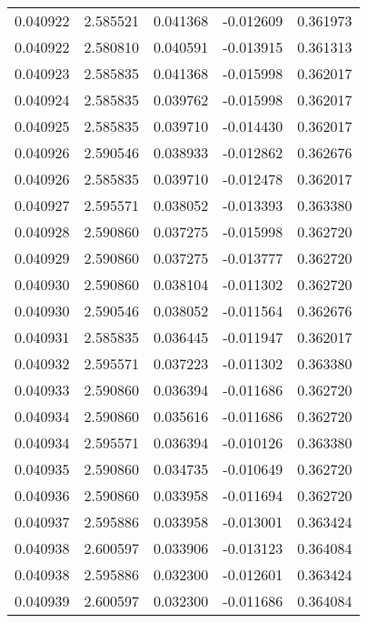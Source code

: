 \begin{tabular}{lrrrr}
0.040922    &  2.585521 &  0.041368 & -0.012609 &             0.361973 \\
0.040922    &  2.580810 &  0.040591 & -0.013915 &             0.361313 \\
0.040923    &  2.585835 &  0.041368 & -0.015998 &             0.362017 \\
0.040924    &  2.585835 &  0.039762 & -0.015998 &             0.362017 \\
0.040925    &  2.585835 &  0.039710 & -0.014430 &             0.362017 \\
0.040926    &  2.590546 &  0.038933 & -0.012862 &             0.362676 \\
0.040926    &  2.585835 &  0.039710 & -0.012478 &             0.362017 \\
0.040927    &  2.595571 &  0.038052 & -0.013393 &             0.363380 \\
0.040928    &  2.590860 &  0.037275 & -0.015998 &             0.362720 \\
0.040929    &  2.590860 &  0.037275 & -0.013777 &             0.362720 \\
0.040930    &  2.590860 &  0.038104 & -0.011302 &             0.362720 \\
0.040930    &  2.590546 &  0.038052 & -0.011564 &             0.362676 \\
0.040931    &  2.585835 &  0.036445 & -0.011947 &             0.362017 \\
0.040932    &  2.595571 &  0.037223 & -0.011302 &             0.363380 \\
0.040933    &  2.590860 &  0.036394 & -0.011686 &             0.362720 \\
0.040934    &  2.590860 &  0.035616 & -0.011686 &             0.362720 \\
0.040934    &  2.595571 &  0.036394 & -0.010126 &             0.363380 \\
0.040935    &  2.590860 &  0.034735 & -0.010649 &             0.362720 \\
0.040936    &  2.590860 &  0.033958 & -0.011694 &             0.362720 \\
0.040937    &  2.595886 &  0.033958 & -0.013001 &             0.363424 \\
0.040938    &  2.600597 &  0.033906 & -0.013123 &             0.364084 \\
0.040938    &  2.595886 &  0.032300 & -0.012601 &             0.363424 \\
0.040939    &  2.600597 &  0.032300 & -0.011686 &             0.364084 \\

\end{tabular}
